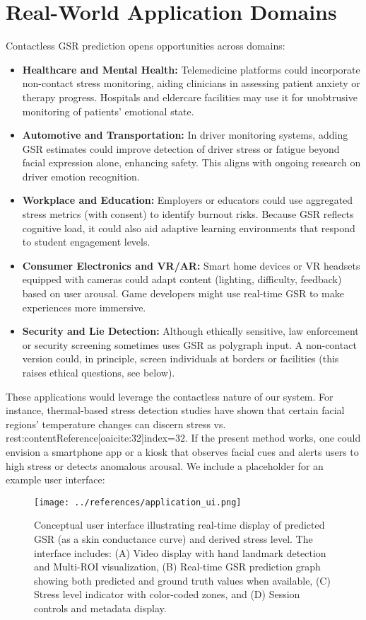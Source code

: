 \documentclass[12pt]{article}
\begin{document}
    \section{Real-World Application Domains}
    Contactless GSR prediction opens opportunities across domains:
    \begin{itemize}
        \item \textbf{Healthcare and Mental Health:} Telemedicine platforms could incorporate non-contact stress monitoring, aiding clinicians in assessing patient anxiety or therapy progress. Hospitals and eldercare facilities may use it for unobtrusive monitoring of patients’ emotional state.
        \item \textbf{Automotive and Transportation:} In driver monitoring systems, adding GSR estimates could improve detection of driver stress or fatigue beyond facial expression alone, enhancing safety. This aligns with ongoing research on driver emotion recognition.
        \item \textbf{Workplace and Education:} Employers or educators could use aggregated stress metrics (with consent) to identify burnout risks. Because GSR reflects cognitive load, it could also aid adaptive learning environments that respond to student engagement levels.
        \item \textbf{Consumer Electronics and VR/AR:} Smart home devices or VR headsets equipped with cameras could adapt content (lighting, difficulty, feedback) based on user arousal. Game developers might use real-time GSR to make experiences more immersive.
        \item \textbf{Security and Lie Detection:} Although ethically sensitive, law enforcement or security screening sometimes uses GSR as polygraph input. A non-contact version could, in principle, screen individuals at borders or facilities (this raises ethical questions, see below).
    \end{itemize}
    These applications would leverage the contactless nature of our system. For instance, thermal-based stress detection studies have shown that certain facial regions’ temperature changes can discern stress vs. rest:contentReference[oaicite:32]{index=32}. If the present method works, one could envision a smartphone app or a kiosk that observes facial cues and alerts users to high stress or detects anomalous arousal. We include a placeholder for an example user interface:
    \begin{figure}[ht]
        \centering
        \texttt{[image: ../references/application\_ui.png]}
        \caption{Conceptual user interface illustrating real-time display of predicted GSR (as a skin conductance curve) and derived stress level. The interface includes: (A) Video display with hand landmark detection and Multi-ROI visualization, (B) Real-time GSR prediction graph showing both predicted and ground truth values when available, (C) Stress level indicator with color-coded zones, and (D) Session controls and metadata display.}
        \label{fig:ui}
    \end{figure}
\end{document}
